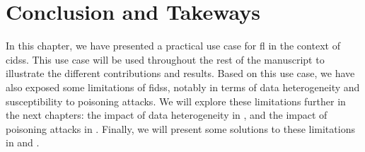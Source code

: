 \section{Conclusion and Takeways\label{sec:app.conclusion}}

In this chapter, we have presented a practical use case for \gls{fl} in the context of \glspl{cids}.
This use case will be used throughout the rest of the manuscript to illustrate the different contributions and results.
Based on this use case, we have also exposed some limitations of \glspl{fids}, notably in terms of data heterogeneity and susceptibility to poisoning attacks.
We will explore these limitations further in the next chapters: the impact of data heterogeneity in , and the impact of poisoning attacks in .
Finally, we will present some solutions to these limitations in  and .